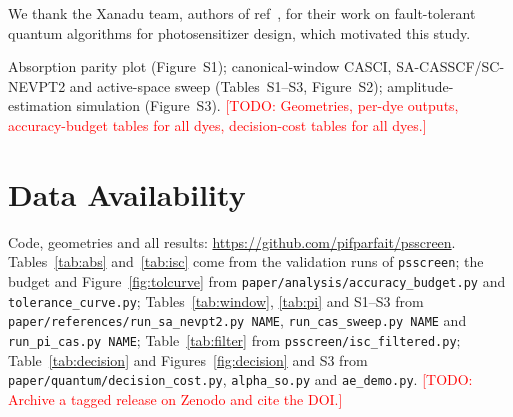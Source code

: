 \documentclass[journal=jctcce,manuscript=article,layout=twocolumn]{achemso}
\newcommand{\todo}[1]{\textcolor{red}{[TODO: #1]}}
\begin{document}
\begin{acknowledgement}
We thank the Xanadu team, authors of ref~, for their work on fault-tolerant
quantum algorithms for photosensitizer design, which motivated this study.
\end{acknowledgement}

\begin{suppinfo}
Absorption parity plot (Figure~S1); canonical-window CASCI, SA-CASSCF/SC-NEVPT2 and active-space sweep
(Tables~S1--S3, Figure~S2); amplitude-estimation simulation (Figure~S3). \todo{Geometries, per-dye
outputs, accuracy-budget tables for all dyes, decision-cost tables for all dyes.}
\end{suppinfo}

\section*{Data Availability}
\sloppy
Code, geometries and all results: \url{https://github.com/pifparfait/psscreen}. Tables~\ref{tab:abs}
and~\ref{tab:isc} come from the validation runs of \texttt{psscreen}; the budget and
Figure~\ref{fig:tolcurve} from \texttt{paper/analysis/accuracy\_budget.py} and \texttt{tolerance\_curve.py};
Tables~\ref{tab:window}, \ref{tab:pi} and S1--S3 from
\texttt{paper/references/run\_sa\_nevpt2.py NAME}, \texttt{run\_cas\_sweep.py NAME} and
\texttt{run\_pi\_cas.py NAME}; Table~\ref{tab:filter} from \texttt{psscreen/isc\_filtered.py};
Table~\ref{tab:decision} and Figures~\ref{fig:decision} and S3 from
\texttt{paper/quantum/decision\_cost.py}, \texttt{alpha\_so.py} and \texttt{ae\_demo.py}. \todo{Archive a tagged
release on Zenodo and cite the DOI.}


\end{document}
